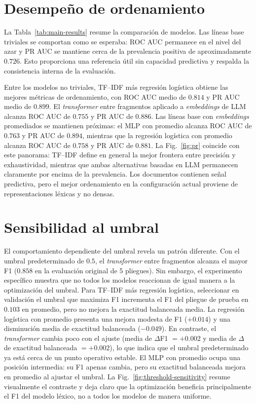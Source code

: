 \section{Desempeño de ordenamiento}
La Tabla~\ref{tab:main-results} resume la comparación de modelos. Las líneas base triviales se comportan como se esperaba: ROC AUC permanece en el nivel del azar y PR AUC se mantiene cerca de la prevalencia positiva de aproximadamente $0.726$. Esto proporciona una referencia útil sin capacidad predictiva y respalda la consistencia interna de la evaluación.

Entre los modelos no triviales, TF--IDF más regresión logística obtiene las mejores métricas de ordenamiento, con ROC AUC medio de $0.814$ y PR AUC medio de $0.899$. El \textit{transformer} entre fragmentos aplicado a \textit{embeddings} de LLM alcanza ROC AUC de $0.755$ y PR AUC de $0.886$. Las líneas base con \textit{embeddings} promediados se mantienen próximas: el MLP con promedio alcanza ROC AUC de $0.763$ y PR AUC de $0.894$, mientras que la regresión logística con promedio alcanza ROC AUC de $0.758$ y PR AUC de $0.881$. La Fig.~\ref{fig:pr} coincide con este panorama: TF--IDF define en general la mejor frontera entre precisión y exhaustividad, mientras que ambas alternativas basadas en LLM permanecen claramente por encima de la prevalencia. Los documentos contienen señal predictiva, pero el mejor ordenamiento en la configuración actual proviene de representaciones léxicas y no densas.

\section{Sensibilidad al umbral}
El comportamiento dependiente del umbral revela un patrón diferente. Con el umbral predeterminado de $0.5$, el \textit{transformer} entre fragmentos alcanza el mayor F1 ($0.858$ en la evaluación original de 5 pliegues). Sin embargo, el experimento específico muestra que no todos los modelos reaccionan de igual manera a la optimización del umbral. Para TF--IDF más regresión logística, seleccionar en validación el umbral que maximiza F1 incrementa el F1 del pliegue de prueba en $0.103$ en promedio, pero no mejora la exactitud balanceada media. La regresión logística con promedio presenta una mejora modesta de F1 ($+0.014$) y una disminución media de exactitud balanceada ($-0.049$). En contraste, el \textit{transformer} cambia poco con el ajuste (media de $\Delta$F1 $=+0.002$ y media de $\Delta$ de exactitud balanceada $=+0.002$), lo que indica que el umbral predeterminado ya está cerca de un punto operativo estable. El MLP con promedio ocupa una posición intermedia: su F1 apenas cambia, pero su exactitud balanceada mejora en promedio al ajustar el umbral. La Fig.~\ref{fig:threshold-sensitivity} resume visualmente el contraste y deja claro que la optimización beneficia principalmente el F1 del modelo léxico, no a todos los modelos de manera uniforme.

